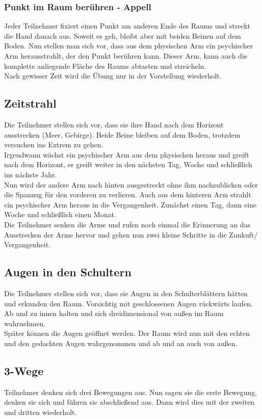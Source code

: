 \documentclass[ngerman, a4paper, twoside]{scrbook}%
\begin{document}
	\subsubsection{Punkt im Raum berühren - Appell}
	Jeder Teilnehmer fixiert einen Punkt am anderen Ende des Raums und streckt die Hand danach aus. Soweit es geh, bleibt aber mit beiden Beinen auf dem Boden. Nun stellen man sich vor, dass aus dem physischen Arm ein psychischer Arm herausstrahlt, der den Punkt berühren kann. Dieser Arm, kann auch die komplette anliegende Fläche des Raums abtasten und streicheln.\\
	Nach gewisser Zeit wird die Übung nur in der Vorstellung wiederholt.
	\subsection{Zeitstrahl}
	Die Teilnehmer stellen sich vor, dass sie ihre Hand nach dem Horizont ausstrecken (Meer, Gebirge). Beide Beine bleiben auf dem Boden, trotzdem versuchen ins Extrem zu gehen.\\
	Irgendwann wächst ein psychischer Arm aus dem physischen heraus und greift nach dem Horizont, er greift weiter in den nächsten Tag, Woche und schließlich ins nächste Jahr.\\ Nun wird der andere Arm nach hinten ausgestreckt ohne ihm nachzublicken oder die Spannug für den vorderen zu verlieren. Auch aus dem hinteren Arm strahlt ein psychischer Arm heraus in die Vergangenheit. Zunächst einen Tag, dann eine Woche und schließlich einen Monat. \\
	Die Teilnehmer senken die Arme und rufen noch einmal die Erinnerung an das Ausstrecken der Arme hervor und gehen nun zwei kleine Schritte in die Zunkuft/ Vergangenheit.
	\subsection{Augen in den Schultern}
	Die Teilnehmer stellen sich vor, dass sie Augen in den Schulterblättern hätten und erkunden den Raum. Vorsichtig mit geschlossenen Augen rückwärts laufen. Ab und zu innen halten und sich dreidimensional von außen im Raum wahrnehmen. \\
	Später können die Augen geöffnet werden. Der Raum wird nun mit den echten und den gedachten Augen wahrgenommen und ab und an auch von außen.
	\subsection{3-Wege}
	Teilnehmer denken sich drei Bewegungen aus. Nun sagen sie die erste Bewegung, denken sie sich und führen sie abschließend aus. Dann wird dies mit der zweiten und dritten wiederholt.\\
\end{document}
